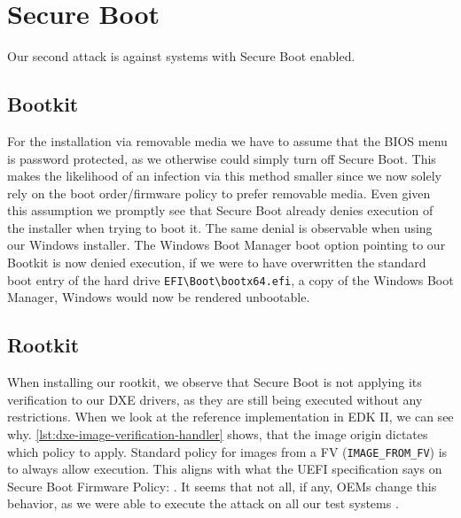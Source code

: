 
\section{Secure Boot}
\label{sec:attack-secure-boot}

Our second attack is against systems with Secure Boot enabled.

\subsection{Bootkit}

For the installation via removable media we have to assume that the \ac{BIOS} menu is password protected, as we otherwise could simply turn off Secure Boot.
This makes the likelihood of an infection via this method smaller since we now solely rely on the boot order/firmware policy to prefer removable media.
Even given this assumption we promptly see that Secure Boot already denies execution of the installer when trying to boot it.
The same denial is observable when using our Windows installer.
The Windows Boot Manager boot option pointing to our Bootkit is now denied execution, if we were to have overwritten the standard boot entry of the hard drive \lstinline{EFI\Boot\bootx64.efi}, a copy of the Windows Boot Manager, Windows would now be rendered unbootable.

\subsection{Rootkit}

When installing our rootkit, we observe that Secure Boot is not applying its verification to our \ac{DXE} drivers, as they are still being executed without any restrictions. When we look at the reference implementation in \ac{EDK} II, we can see why. \autoref{lst:dxe-image-verification-handler} shows, that the image origin dictates which policy to apply. Standard policy for images from a \acf{FV} (\lstinline{IMAGE_FROM_FV}) is to always allow execution. This aligns with what the \ac{UEFI} specification says on Secure Boot Firmware Policy: . It seems that not all, if any, \acp{OEM} change this behavior, as we were able to execute the attack on all our test systems .

